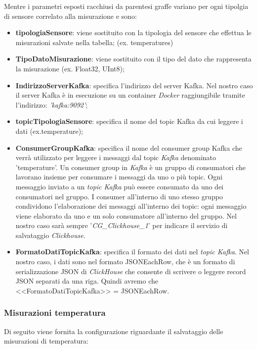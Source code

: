     Mentre i parametri esposti racchiusi da parentesi graffe variano per ogni tipolgia di sensore correlato alla misurazione e sono:
    \begin{itemize}
        \item \textbf{tipologiaSensore}: viene sostituito con la tipologia del sensore che effettua le misurazioni salvate nella tabella; (ex. temperatures)
        \item \textbf{TipoDatoMisurazione}: viene sostituito con il tipo del dato che rappresenta la misurazione (ex. Float32, UInt8);
        \item \textbf{IndirizzoServerKafka}: specifica l'indirizzo del server Kafka.
        Nel nostro caso il server Kafka è in esecuzione su un container \textit{Docker} raggiungibile tramite l'indirizzo:
         \textit{'kafka:9092'};
        \item \textbf{topicTipologiaSensore}: specifica il nome del topic Kafka da cui leggere i dati (ex.temperature);
        \item \textbf{ConsumerGroupKafka}: specifica il nome del consumer group Kafka che verrà utilizzato per leggere i messaggi dal topic \textit{Kafka} denominato 'temperature'.
        Un consumer group in \textit{Kafka} è un gruppo di consumatori che lavorano insieme per consumare i messaggi da uno o più topic. Ogni messaggio inviato a un \textit{topic Kafka} può essere consumato da uno dei consumatori nel gruppo. I consumer all'interno di uno stesso gruppo condividono l'elaborazione dei messaggi all'interno dei topic: ogni messaggio viene elaborato da uno e un solo consumatore all'interno del gruppo. Nel nostro caso sarà sempre '\textit{CG\_Clickhouse\_1}' per indicare il servizio di salvataggio \textit{Clickhouse}.
        \item \textbf{FormatoDatiTopicKafka}: specifica il formato dei dati nel \textit{topic Kafka}. Nel nostro caso, i dati sono nel formato JSONEachRow, che è un formato di serializzazione JSON di \textit{ClickHouse} che consente di scrivere o leggere record JSON separati da una riga. Quindi avremo che <<FormatoDatiTopicKafka>> = JSONEachRow.
    \end{itemize}

    
\subsubsection{Misurazioni temperatura} \label{sec:tab_temperatures}
Di seguito viene fornita la configurazione riguardante il salvataggio delle misurazioni di temperatura:

